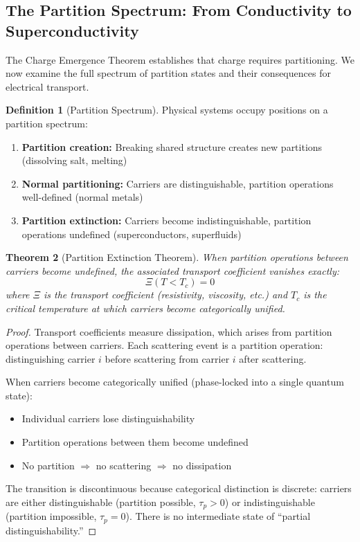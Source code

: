 \documentclass[twocolumn,10pt,a4paper]{article}
\newtheorem{theorem}{Theorem}[section]
\theoremstyle{definition}
\newtheorem{definition}[theorem]{Definition}
\theoremstyle{remark}
\begin{document}
\subsection{The Partition Spectrum: From Conductivity to Superconductivity}

The Charge Emergence Theorem establishes that charge requires partitioning. We now examine the full spectrum of partition states and their consequences for electrical transport.

\begin{definition}[Partition Spectrum]
\label{def:partition_spectrum}
Physical systems occupy positions on a partition spectrum:
\begin{enumerate}
    \item \textbf{Partition creation:} Breaking shared structure creates new partitions (dissolving salt, melting)
    \item \textbf{Normal partitioning:} Carriers are distinguishable, partition operations well-defined (normal metals)
    \item \textbf{Partition extinction:} Carriers become indistinguishable, partition operations undefined (superconductors, superfluids)
\end{enumerate}
\end{definition}

\begin{theorem}[Partition Extinction Theorem]
\label{thm:extinction}
When partition operations between carriers become undefined, the associated transport coefficient vanishes exactly:
\begin{equation}
    \Xi(T < T_c) = 0
\end{equation}
where $\Xi$ is the transport coefficient (resistivity, viscosity, etc.) and $T_c$ is the critical temperature at which carriers become categorically unified.
\end{theorem}

\begin{proof}
Transport coefficients measure dissipation, which arises from partition operations between carriers. Each scattering event is a partition operation: distinguishing carrier $i$ before scattering from carrier $i$ after scattering.

When carriers become categorically unified (phase-locked into a single quantum state):
\begin{itemize}
    \item Individual carriers lose distinguishability
    \item Partition operations between them become undefined
    \item No partition $\Rightarrow$ no scattering $\Rightarrow$ no dissipation
\end{itemize}

The transition is discontinuous because categorical distinction is discrete: carriers are either distinguishable (partition possible, $\tau_p > 0$) or indistinguishable (partition impossible, $\tau_p = 0$). There is no intermediate state of ``partial distinguishability.''
\end{proof}
\end{document}
